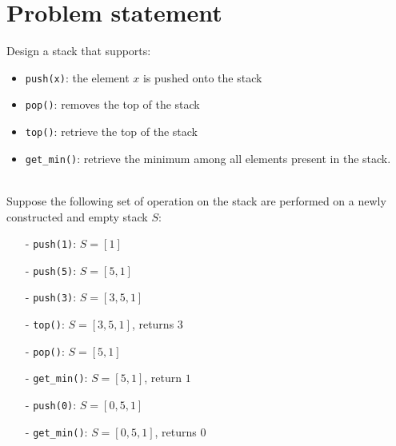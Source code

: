 \section{Problem statement}
\begin{exercise}
Design a stack that supports:

\begin{itemize}
	\item \lstinline[columns=fixed]{push(x)}: the element $x$ is pushed onto the stack
	\item \lstinline[columns=fixed]{pop()}: removes the top of the stack
	\item \lstinline[columns=fixed]{top()}: retrieve the top of the stack
	\item \lstinline[columns=fixed]{get_min()}: retrieve the minimum among all elements present in the stack.
\end{itemize}


	\begin{example}
		\hfill \\
		Suppose the following set of operation on the stack are performed on a newly constructed and empty stack $S$:
		\begin{itemize}
			\item[-] \lstinline[columns=fixed]{push(1)}: $S=[1]$
			\item[-] \lstinline[columns=fixed]{push(5)}: $S=[5,1]$
			\item[-] \lstinline[columns=fixed]{push(3)}: $S=[3,5,1]$
			\item[-] \lstinline[columns=fixed]{top()}: $S=[3,5,1]$, returns $3$
			\item[-] \lstinline[columns=fixed]{pop()}: $S=[5,1]$
			\item[-] \lstinline[columns=fixed]{get_min()}: $S=[5,1]$, return $1$
			\item[-] \lstinline[columns=fixed]{push(0)}: $S=[0,5,1]$
			\item[-] \lstinline[columns=fixed]{get_min()}: $S=[0,5,1]$, returns $0$
		\end{itemize}

	\end{example}


\end{exercise}

